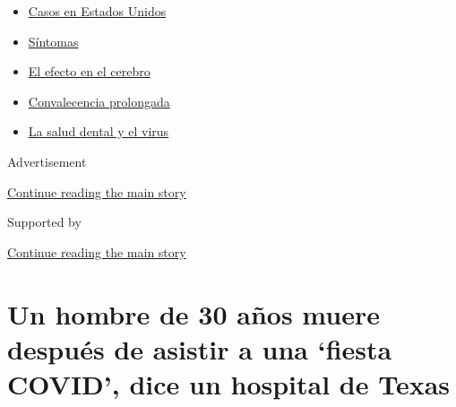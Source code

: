 \begin{itemize}
\tightlist
\item
  \href{https://www.nytimes3xbfgragh.onion/es/interactive/2020/espanol/mundo/coronavirus-en-estados-unidos.html?name=styln-coronavirus-es\&region=TOP_BANNER\&block=storyline_menu_recirc\&action=click\&pgtype=Article\&impression_id=64d91330-f52e-11ea-ac8a-f5eef0546dac\&variant=undefined}{Casos
  en Estados Unidos}
\item
  \href{https://www.nytimes3xbfgragh.onion/es/interactive/2020/08/06/espanol/ciencia-y-tecnologia/tengo-covid-19-sintomas.html?name=styln-coronavirus-es\&region=TOP_BANNER\&block=storyline_menu_recirc\&action=click\&pgtype=Article\&impression_id=64d91331-f52e-11ea-ac8a-f5eef0546dac\&variant=undefined}{Síntomas}
\item
  \href{https://www.nytimes3xbfgragh.onion/es/2020/09/11/espanol/ciencia-y-tecnologia/cerebro-coronavirus.html?name=styln-coronavirus-es\&region=TOP_BANNER\&block=storyline_menu_recirc\&action=click\&pgtype=Article\&impression_id=64d91332-f52e-11ea-ac8a-f5eef0546dac\&variant=undefined}{El
  efecto en el cerebro}
\item
  \href{https://www.nytimes3xbfgragh.onion/es/2020/09/09/espanol/ciencia-y-tecnologia/salud-mental-coronavirus.html?name=styln-coronavirus-es\&region=TOP_BANNER\&block=storyline_menu_recirc\&action=click\&pgtype=Article\&impression_id=64d91333-f52e-11ea-ac8a-f5eef0546dac\&variant=undefined}{Convalecencia
  prolongada}
\item
  \href{https://www.nytimes3xbfgragh.onion/es/2020/09/08/espanol/ciencia-y-tecnologia/dentistas-covid-dientes.html?name=styln-coronavirus-es\&region=TOP_BANNER\&block=storyline_menu_recirc\&action=click\&pgtype=Article\&impression_id=64d91334-f52e-11ea-ac8a-f5eef0546dac\&variant=undefined}{La
  salud dental y el virus}
\end{itemize}

Advertisement

\protect\hyperlink{after-top}{Continue reading the main story}

Supported by

\protect\hyperlink{after-sponsor}{Continue reading the main story}

\hypertarget{un-hombre-de-30-auxf1os-muere-despuuxe9s-de-asistir-a-una-fiesta-covid-dice-un-hospital-de-texas}{%
\section{Un hombre de 30 años muere después de asistir a una `fiesta
COVID', dice un hospital de
Texas}\label{un-hombre-de-30-auxf1os-muere-despuuxe9s-de-asistir-a-una-fiesta-covid-dice-un-hospital-de-texas}}

